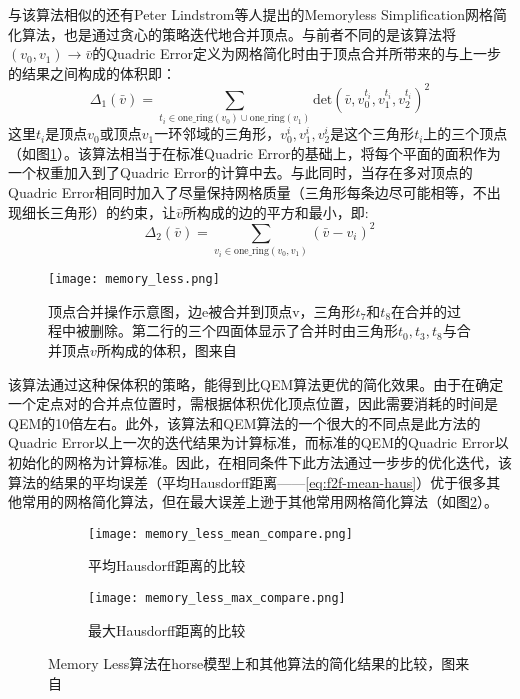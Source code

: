 与该算法相似的还有Peter Lindstrom等人提出的Memoryless Simplification网格简化算法\cite{memory-less}，也是通过贪心的策略迭代地合并顶点。与前者不同的是该算法将$(v_0,v_1) \to \bar{v}$的Quadric Error定义为网格简化时由于顶点合并所带来的与上一步的结果之间构成的体积即：
\begin{equation}
  \Delta_1(\bar{v}) = \sum_{t_i \in \text{one\_ring}(v_0) \cup \text{one\_ring}(v_1)} \text{det} (\bar{v},v_0^{t_i},v_1^{t_i},v_2^{t_i})^2
\end{equation}
这里$t_i$是顶点$v_0$或顶点$v_1$一环邻域的三角形，$v_0^i,v_1^i, v_2^i$是这个三角形$t_i$上的三个顶点（如图\ref{fig:memory-less}）。该算法相当于在标准Quadric Error的基础上，将每个平面的面积作为一个权重加入到了Quadric Error的计算中去。与此同时，当存在多对顶点的Quadric Error相同时加入了尽量保持网格质量（三角形每条边尽可能相等，不出现细长三角形）的约束，让$\bar{v}$所构成的边的平方和最小，即:
\begin{equation}
  \Delta_2(\bar{v}) = \sum_{v_i \in \text{one\_ring} (v_0,v_1)} (\bar{v}-v_i)^2
\end{equation}
\begin{figure}[htbp]
    \centering
    \texttt{[image: memory\_less.png]}
    \caption[顶点合并操作]{顶点合并操作示意图，边e被合并到顶点v，三角形$t_7$和$t_8$在合并的过程中被删除。第二行的三个四面体显示了合并时由三角形$t_0,t_3,t_8$与合并顶点$v$所构成的体积，图来自\cite{memory-less}}
    \label{fig:memory-less}
\end{figure}
该算法通过这种保体积的策略，能得到比QEM算法更优的简化效果。由于在确定一个定点对的合并点位置时，需根据体积优化顶点位置，因此需要消耗的时间是QEM的10倍左右。此外，该算法和QEM算法的一个很大的不同点是此方法的Quadric Error以上一次的迭代结果为计算标准，而标准的QEM的Quadric Error以初始化的网格为计算标准。因此，在相同条件下此方法通过一步步的优化迭代，该算法的结果的平均误差（平均Hausdorff距离——\ref{eq:f2f-mean-haus}）优于很多其他常用的网格简化算法，但在最大误差上逊于其他常用网格简化算法（如图\ref{fig:memory-less-compare}）。
\begin{figure}[htbp]
  \centering
  \begin{subfigure}[b]{0.7\textwidth}
    \texttt{[image: memory\_less\_mean\_compare.png]}
    \caption[input]{平均Hausdorff距离的比较}
    \end{subfigure}
    \begin{subfigure}[b]{0.7\textwidth}
      \texttt{[image: memory\_less\_max\_compare.png]}
      \caption[mls]{最大Hausdorff距离的比较}
    \end{subfigure}
    \caption[Memory Less简化结果]{Memory Less算法在horse模型上和其他算法的简化结果的比较，图来自\cite{memory-less}}
    \label{fig:memory-less-compare}
\end{figure}

